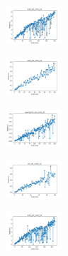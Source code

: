 \begin{figure}[H]
\begin{subfigure}
    \end{subfigure}
    \hfill
    \begin{subfigure}
        \centering
        \includegraphics[width=0.234\textwidth]{img/bl/ecoli_set_const_10_589741062_time.png}
    \end{subfigure}
    \hfill
    \begin{subfigure}
        \centering
        \includegraphics[width=0.234\textwidth]{img/bl/rand_set_const_10_589741062_time.png}
    \end{subfigure}
    \hfill
    \begin{subfigure}
        \centering
        \includegraphics[width=0.234\textwidth]{img/bl/newthyroid_set_const_10_589741062_time.png}
    \end{subfigure}
    \hfill
    \begin{subfigure}
        \centering
        \includegraphics[width=0.234\textwidth]{img/bl/iris_set_const_10_277451237_time.png}
    \end{subfigure}
    \hfill
    \begin{subfigure}
        \centering
        \includegraphics[width=0.234\textwidth]{img/bl/ecoli_set_const_10_277451237_time.png}
    \end{subfigure}
    \hfill
    \begin{subfigure}

\end{subfigure}
\end{figure}
